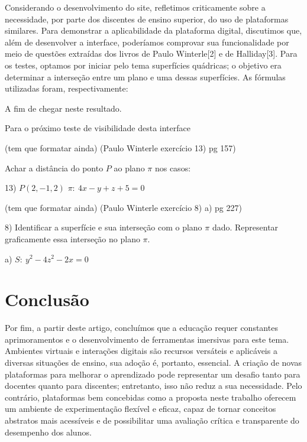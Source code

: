 \documentclass[conference,a4paper]{IEEEtran}
\begin{document}
Considerando o desenvolvimento do site, refletimos criticamente sobre a necessidade, por parte dos discentes de ensino superior, do uso de plataformas similares. Para demonstrar a aplicabilidade da plataforma digital, discutimos que, além de desenvolver a interface, poderíamos comprovar sua funcionalidade por meio de questões extraídas dos livros de Paulo Winterle[2] e de Halliday[3]. Para os testes, optamos por iniciar pelo tema superfícies quádricas; o objetivo era determinar a interseção entre um plano e uma dessas superfícies. As fórmulas utilizadas foram, respectivamente:

A fim de chegar neste resultado.

\begin{figure}[h]
\centering
{}
\caption{ }
\label{fig:secao}
\end{figure}

Para o próximo teste de visibilidade desta interface

(tem que formatar ainda) (Paulo Winterle exercício 13) pg 157)

Achar a distância do ponto $P$ ao plano $\pi$ nos casos:

13) $P(2,-1,2)$ \quad $\pi:\ 4x - y + z + 5 = 0$

(tem que formatar ainda) (Paulo Winterle exercício 8) a) pg 227)

8) Identificar a superfície e sua interseção com o plano $\pi$ dado. Representar graficamente essa interseção no plano $\pi$.

a) $S:\ y^2 - 4z^2 - 2x = 0$

\section{Conclusão}

Por fim, a partir deste artigo, concluímos que a educação requer constantes aprimoramentos e o desenvolvimento de ferramentas imersivas para este tema. Ambientes virtuais e interações digitais são recursos versáteis e aplicáveis a diversas situações de ensino, sua adoção é, portanto, essencial. A criação de novas plataformas para melhorar o aprendizado pode representar um desafio tanto para docentes quanto para discentes; entretanto, isso não reduz a sua necessidade. Pelo contrário, plataformas bem concebidas como a proposta neste trabalho oferecem um ambiente de experimentação flexível e eficaz, capaz de tornar conceitos abstratos mais acessíveis e de possibilitar uma avaliação crítica e transparente do desempenho dos alunos.
\end{document}
